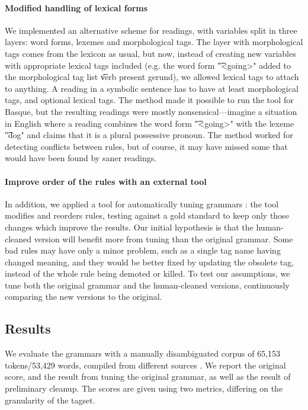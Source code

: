 {{\paragraph{Modified handling of lexical forms}

We implemented an alternative scheme for readings, with variables
split in three layers: word forms, lexemes and morphological tags. The
layer with morphological tags comes from the lexicon as usual, but
now, instead of creating new variables with appropriate lexical tags
included (e.g. the word form \t{"<going>"} added to the morphological
tag list \t{verb present gerund}), we allowed lexical tags to attach
to anything. A reading in a symbolic sentence has to have at least
morphological tags, and optional lexical tags. The method made it
possible to run the tool for Basque, but the resulting readings were
mostly nonsensical---imagine a situation in English where a reading
combines the word form \t{"<going>"} with the lexeme \t{"dog"} and
claims that it is a plural possessive pronoun. The method worked for
detecting conflicts between rules, but of course, it may have missed
some that would have been found by saner readings.

\paragraph{Improve order of the rules with an external tool}

In addition, we applied a tool for automatically tuning grammars
\cite{bick2013tuning}: the tool modifies and reorders rules, testing
against a gold standard to keep only those changes which improve the results.
Our initial hypothesis is that the human-cleaned version will benefit more 
from tuning than the original grammar. Some bad rules may have only a minor 
problem, such as a single tag name having changed meaning, and they would be 
better fixed by updating the obsolete tag, instead of the whole rule being 
demoted or killed. To test our assumptions, we tune both the original
grammar and the human-cleaned versions, continuously comparing the new
versions to the original.


\subsection{Results}

We evaluate the grammars with a manually disambiguated corpus of
65,153 tokens/53,429 words, compiled from different sources
\cite{aduriz2006epec}.  We report the original score, and the result
from tuning the original grammar, as well as the result of
preliminary cleanup.  The scores are given using two metrics,
differing on the granularity of the tagset.

}}
